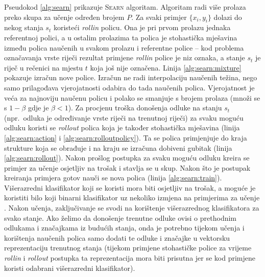 Pseudokod \ref{alg:searn} prikazuje \textsc{Searn} algoritam. Algoritam radi
više prolaza preko skupa za učenje određen brojem $P$. Za svaki primjer $\{x_i,
y_i\}$ dolazi do nekog stanja $s_t$ koristeći \textit{rollin} policu. Ona je pri
prvom prolazu jednaka referentnoj polici, a u ostalim prolazima ta polica je
stohastička mješavina između polica naučenih u svakom prolazu i referentne
police -- kod problema označavanja vrste riječi rezultat primjene
\textit{rollin} police je niz oznaka, a stanje $s_t$ je riječ u rečenici na
mjestu $t$ koja još nije označena. Linija \ref{alg:searn:mixture} pokazuje
izračun nove police. Izračun ne radi interpolaciju naučenih težina, nego samo
prilagođava vjerojatnosti odabira do tada naučenih polica. Vjerojatnost je veća
za najnoviju naučenu policu i polako se smanjuje s brojem prolaza (množi se s
$1-\beta$ gdje je $\beta < 1$). Za procjenu troška donošenja odluke na stanju
$s_t$ (npr.~odluka je određivanje vrste riječi na trenutnoj riječi) za svaku
moguću odluku koristi se \textit{rollout} polica koja je također stohastička
mješavina (linija \ref{alg:searn:action} i \ref{alg:searn:rolloutpolicy}). Ta se
polica primjenjuje do kraja strukture koja se obrađuje i na kraju se izračuna
dobiveni gubitak (linija \ref{alg:searn:rollout}). Nakon prošlog postupka za
svaku moguću odluku kreira se primjer za učenje osjetljiv na trošak i stavlja se
u skup. Nakon što je postupak kreiranja primjera gotov nauči se nova polica
(linija \ref{alg:searn:train}). Višerazredni klasifikator koji se koristi mora
biti osjetljiv na trošak, a moguće je koristiti bilo koji binarni klasifikator
uz nekoliko izmjena na primjerima za učenje \citep{zadrozny2003cost,
beygelzimer2005weighted, beygelzimer2005error}. Nakon učenja, zaključivanje se
svodi na korištenje višerazrednog klasifikatora za svako stanje. Ako želimo da
donošenje trenutne odluke ovisi o prethodnim odlukama i značajkama iz budućih
stanja, onda je potrebno tijekom učenja i korištenja naučenih polica samo dodati
te odluke i značajke u vektorsku reprezentaciju trenutnog stanja (tijekom
primjene stohastičke police za vrijeme \textit{rollin} i \textit{rollout}
postupka ta reprezentacija mora biti prisutna jer se kod primjene koristi
odabrani višerazredni klasifikator).

